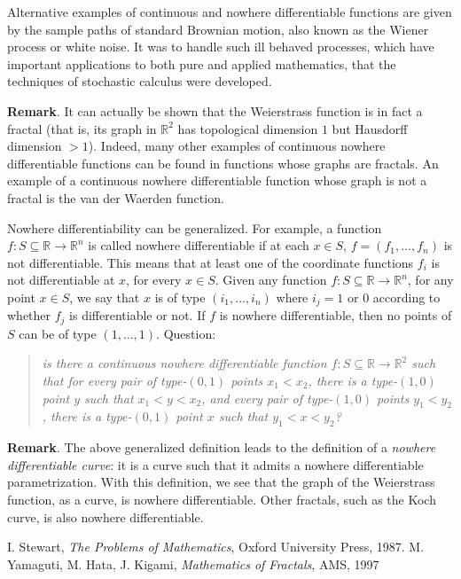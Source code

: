 \documentclass{article}
\begin{document}
Alternative examples of continuous and nowhere differentiable functions are given by the sample paths of standard Brownian motion, also known as the Wiener process or white noise. It was to handle such ill behaved processes, which have important applications to both pure and applied mathematics, that the techniques of stochastic calculus were developed.


\textbf{Remark}.  It can actually be shown that the Weierstrass function is in fact a fractal (that is, its graph in $\mathbb{R}^2$ has topological dimension $1$ but Hausdorff dimension $>1$).  Indeed, many other examples of continuous nowhere differentiable functions can be found in functions whose graphs are fractals.  An example of a continuous nowhere differentiable function whose graph is not a fractal is the van der Waerden function.  

Nowhere differentiability can be generalized.  For example, a function $f:S\subseteq \mathbb{R}\to \mathbb{R}^n$ is called nowhere differentiable if at each $x\in S$, $f=(f_1,\ldots,f_n)$ is not differentiable.  This means that at least one of the coordinate functions $f_i$ is not differentiable at $x$, for every $x\in S$.  Given any function $f:S\subseteq \mathbb{R}\to \mathbb{R}^n$, for any point $x\in S$, we say that $x$ is of type $(i_1,\ldots,i_n)$ where $i_j=1$ or $0$ according to whether $f_j$ is differentiable or not.  If $f$ is nowhere differentiable, then no points of $S$ can be of type $(1,\ldots,1)$.  Question: 
\begin{quote}\emph{
is there a continuous nowhere differentiable function $f:S\subseteq \mathbb{R}\to \mathbb{R}^2$ such that for every pair of type-$(0,1)$ points $x_1<x_2$, there is a type-$(1,0)$ point $y$ such that $x_1<y<x_2$, and every pair of type-$(1,0)$ points $y_1<y_2$, there is a type-$(0,1)$ point $x$ such that $y_1<x<y_2$?}
\end{quote}
\textbf{Remark}.  The above generalized definition leads to the definition of a \emph{nowhere differentiable curve}: it is a curve such that it admits a nowhere differentiable parametrization.  With this definition, we see that the graph of the Weierstrass function, as a curve, is nowhere differentiable.  Other fractals, such as the Koch curve, is also nowhere differentiable.

\begin{thebibliography}{9}
 I. Stewart, \emph{The Problems of Mathematics}, 
Oxford University Press, 1987. 
 M. Yamaguti, M. Hata, J. Kigami, \emph{Mathematics of Fractals},
AMS, 1997
\end{thebibliography}
\end{document}

